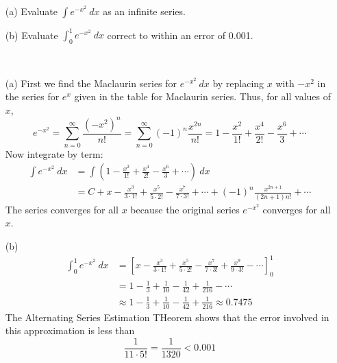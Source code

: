   \\~\\
  \begin{example}
    \hphantom{ }\\
    \begin{enumerate}
      \item[(a)] Evaluate $\displaystyle \int e^{-x^2}\ dx$ as an infinite series.
      \item[(b)] Evaluate $\displaystyle \int_{0}^{1} e^{-x^2}\ dx$ correct to within an error of 0.001.
    \end{enumerate}
  \end{example}
  \begin{solution}
    \hphantom{ }\\
    \begin{enumerate}
      \item[(a)] First we find the Maclaurin series for $e^{-x^2}\ dx$ by replacing $x$ with $-x^2$ in the series for $e^x$ given in the table for Maclaurin series. Thus, for all values of $x$,
      $$ e^{-x^2} = \sum_{n=0}^{\infty} \frac{(-x^2)^n}{n!}  = \sum_{n=0}^{\infty} (-1)^n \frac{x^{2n}}{n!} = 1 - \frac{x^2}{1!} + \frac{x^4}{2!} - \frac{x^6}{3} + \cdots$$
      Now integrate by term:
      \begin{align*}
        \int e^{-x^2}\ dx &= \int \left( 1 - \frac{x^2}{1!} + \frac{x^4}{2!} - \frac{x^6}{3} + \cdots \right)\ dx \\
        &= C + x - \frac{x^3}{3 \cdot 1!} + \frac{x^5}{5 \cdot 2!} - \frac{x^7}{7 \cdot 3!} + \cdots + (-1)^n \frac{x^{2n+1}}{(2n+1)n!} + \cdots
      \end{align*}
      The series converges for all $x$ because the original series $e^{-x^2}$ converges for all $x$.
      \item[(b)]
      \begin{align*}
        \int_{0}^{1} e^{-x^2}\ dx &= \left[ x - \frac{x^3}{3 \cdot 1!} + \frac{x^5}{5 \cdot 2!} - \frac{x^7}{7 \cdot 3!} + \frac{x^9}{9 \cdot 3!} - \cdots \right]_{0}^{1} \\
        &= 1 - \tfrac{1}{3} + \tfrac{1}{10} - \tfrac{1}{42} + \tfrac{1}{216} - \cdots \\
        &\approx 1 - \tfrac{1}{3} + \tfrac{1}{10} - \tfrac{1}{42} + \tfrac{1}{216} \approx 0.7475
      \end{align*}
      The Alternating Series Estimation THeorem shows that the error involved in this approximation is less than
      $$ \frac{1}{11 \cdot 5!} = \frac{1}{1320} < 0.001 $$
    \end{enumerate}
  \end{solution}
